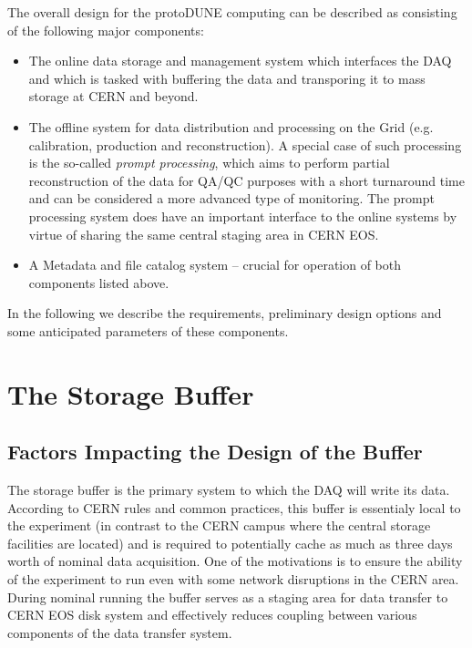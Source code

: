 \documentclass[pdftex,12pt,letter]{article}
\begin{document}
The overall design for the protoDUNE computing can be described as consisting of the following major components:
\begin{itemize}

\item The online data storage and management system which interfaces the DAQ and which is tasked with buffering
the data and transporing it to mass storage at CERN and beyond.

\item The offline system for data distribution and processing on the Grid (e.g. calibration, production and reconstruction). A special case
of such processing is the so-called \textit{prompt processing}, which aims to perform partial reconstruction of the data for QA/QC purposes
with a short turnaround time and can be considered a more advanced type of monitoring. The prompt processing system
does have an important interface to the online systems by virtue of sharing the same central staging area in CERN EOS.

\item A Metadata and file catalog system -- crucial for operation of both components listed above.

\end{itemize}

\noindent In the following we describe the requirements, preliminary design options and some anticipated parameters
of these components.

\section{The Storage Buffer}
\subsection{Factors Impacting the Design of the Buffer}
The storage buffer is the primary system to which the DAQ will write its data.
According to CERN rules and common practices, this buffer is essentialy local to the experiment
(in contrast to the CERN campus where the central storage facilities are located) and is
required to potentially cache as much as
three days worth of nominal data acquisition. One of the motivations is to ensure
the ability of the experiment to run even with some network disruptions in the CERN area.
During nominal running the buffer serves as a staging area for data transfer
to CERN EOS disk system and effectively reduces coupling between various components of the
data transfer system.
\end{document}
